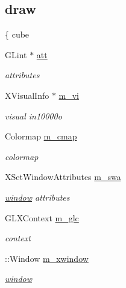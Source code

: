 \subsection*{draw}
\label{_amgrp817491bc777731f0f0c6e485f28e4d86}
 \{ cube \begin{DoxyCompactItemize}
\item 
GLint $\ast$ \hyperlink{classnebula_1_1platform_1_1renderer_1_1gl_1_1glx_1_1base_aac9ff579604bfe3676c7fdeba253c3d7}{att}
\begin{DoxyCompactList}\small\item\em attributes \item\end{DoxyCompactList}\item 
XVisualInfo $\ast$ \hyperlink{classnebula_1_1platform_1_1renderer_1_1gl_1_1glx_1_1base_a2df56a32e4bd22c74ac1bef7d23d80aa}{m\_\-vi}
\begin{DoxyCompactList}\small\item\em visual in10000o \item\end{DoxyCompactList}\item 
Colormap \hyperlink{classnebula_1_1platform_1_1renderer_1_1gl_1_1glx_1_1base_a15dfd5db19d14a9b1b4ce038e9168545}{m\_\-cmap}
\begin{DoxyCompactList}\small\item\em colormap \item\end{DoxyCompactList}\item 
XSetWindowAttributes \hyperlink{classnebula_1_1platform_1_1renderer_1_1gl_1_1glx_1_1base_a8346b7b80d3d397e563d4b93a44be523}{m\_\-swa}
\begin{DoxyCompactList}\small\item\em \hyperlink{namespacenebula_1_1platform_1_1window}{window} attributes \item\end{DoxyCompactList}\item 
GLXContext \hyperlink{classnebula_1_1platform_1_1renderer_1_1gl_1_1glx_1_1base_a77dba9715eb9d07d7516412450d95959}{m\_\-glc}
\begin{DoxyCompactList}\small\item\em context \item\end{DoxyCompactList}\item 
::Window \hyperlink{classnebula_1_1platform_1_1renderer_1_1gl_1_1glx_1_1base_a2bf236ce2dfd4bbb648094700d4582ec}{m\_\-xwindow}
\begin{DoxyCompactList}\small\item\em \hyperlink{namespacenebula_1_1platform_1_1window}{window} \item\end{DoxyCompactList}\item 

\end{DoxyCompactItemize}
